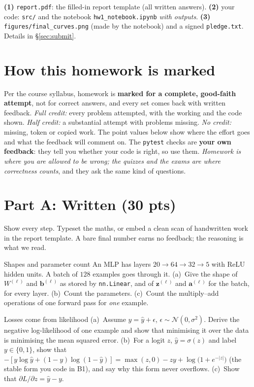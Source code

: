 \documentclass[11pt,a4paper]{article}
\begin{document}
\begin{infobox}[title={What you submit (one zip)}]
\textbf{(1)} \texttt{report.pdf}: the filled-in report template (all written answers). \textbf{(2)} your code: \texttt{src/} and the notebook \texttt{hw1\_notebook.ipynb} \emph{with outputs}.
\textbf{(3)} \texttt{figures/final\_curves.png} (made by the notebook) and a signed \texttt{pledge.txt}. Details in \S\ref{sec:submit}.
\end{infobox}

\section{How this homework is marked}
Per the course syllabus, homework is \textbf{marked for a complete, good-faith attempt}, not for correct answers, and every set comes back with written feedback.
\emph{Full credit:} every problem attempted, with the working and the code shown. \emph{Half credit:} a substantial attempt with problems missing.
\emph{No credit:} missing, token or copied work. The point values below show where the effort goes and what the feedback will comment on. The \texttt{pytest} checks are \textbf{your own feedback}:
they tell you whether your code is right, so use them. \emph{Homework is where you are allowed to be wrong; the quizzes and the exams are where correctness counts}, and
they ask the same kind of questions.

\section{Part A: Written (30 pts)}
Show every step. Typeset the maths, or embed a clean scan of handwritten work in the report template. A bare final number earns no feedback; the reasoning is what we read.

\begin{problem}[3 pts]{Shapes and parameter count}
An MLP has layers $20\to64\to32\to5$ with ReLU hidden units. A batch of $128$ examples goes through it. (a)~Give the shape of $W^{(\ell)}$ and $\mathbf b^{(\ell)}$ as stored by
\texttt{nn.Linear}, and of $\mathbf z^{(\ell)}$ and $\mathbf a^{(\ell)}$ for the batch, for every layer. (b)~Count the parameters. (c)~Count the multiply--add operations of one forward pass for \emph{one} example.
\end{problem}

\begin{problem}[4 pts]{Losses come from likelihood}
(a)~Assume $y=\hat y+\epsilon$, $\epsilon\sim\mathcal N(0,\sigma^2)$. Derive the negative log-likelihood of one example and show that minimising it over the data is minimising the mean squared error.
(b)~For a logit $z$, $\hat y=\sigma(z)$ and label $y\in\{0,1\}$, show that
$-[y\log\hat y+(1-y)\log(1-\hat y)]=\max(z,0)-zy+\log\!\big(1+e^{-|z|}\big)$ (the stable form you code in B1), and say why this form never overflows.
(c)~Show that $\partial L/\partial z=\hat y-y$.
\end{problem}
\end{document}
